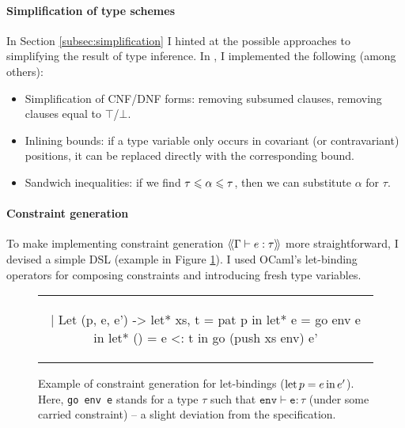 
\paragraph{Simplification of type schemes} In Section \ref{subsec:simplification} I hinted at the possible approaches to simplifying the result of type inference. In \compiler{}, I implemented the following (among others): \begin{itemize}
    \item Simplification of CNF/DNF forms: removing subsumed clauses, removing  clauses equal to $\top$/$\bot$.
    \item Inlining bounds: if a type variable only occurs in covariant (or contravariant) positions, it can be replaced directly with the corresponding bound.
    \item Sandwich inequalities: if we find $\tau \leqslant \alpha \leqslant \tau$, then we can substitute $\alpha$ for $\tau$.
\end{itemize}

\paragraph{Constraint generation} To make implementing constraint generation $\cstr{\Gamma}{e}{\tau}$ more straightforward, I devised a simple DSL (example in Figure \ref{fig:cstr-gen}). I used OCaml's let-binding operators for composing constraints and introducing fresh type variables. 

\begin{figure}
    \centering
\begin{tabular}{c}
\begin{ocaml}
| Let (p, e, e') ->
    let* xs, t = pat p in
    let* e = go env e in
    let* () = e <: t in
    go (push xs env) e'
\end{ocaml}
\end{tabular}
    \caption{Example of constraint generation for \fabric{} let-bindings ($\mathrm{let}\,{p}={e}\,\mathrm{in}\, e'$). Here, \texttt{go env e} stands for a type $\tau$ such that $\texttt{env} \vdash \texttt{e} : \tau$ (under some carried constraint) -- a slight deviation from the specification.}
    \label{fig:cstr-gen}
\end{figure}

